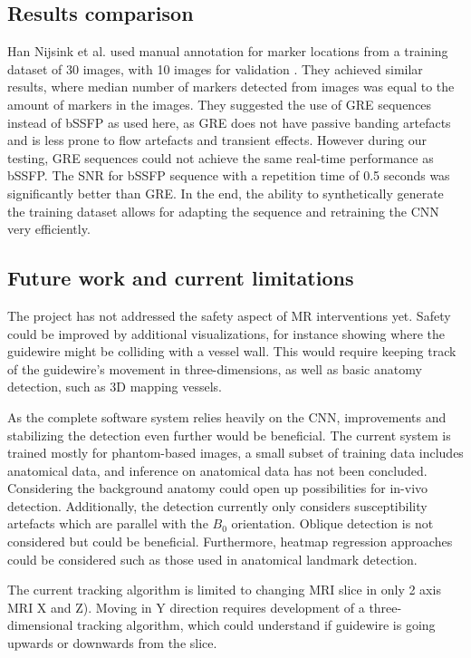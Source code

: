\documentclass[conference]{IEEEtran}
\begin{document}
\subsection{Results comparison}
Han Nijsink et al. used manual annotation for marker locations from a training dataset of 30 images, with 10 images for validation \cite{pmid35199259}. They achieved similar results, where median number of markers detected from images was equal to the amount of markers in the images. They suggested the use of GRE sequences instead of bSSFP as used here, as GRE does not have passive banding artefacts and is less prone to flow artefacts and transient effects. However during our testing, GRE sequences could not achieve the same real-time performance as bSSFP. The SNR for bSSFP sequence with a repetition time of 0.5 seconds was significantly better than GRE. In the end, the ability to synthetically generate the training dataset allows for adapting the sequence and retraining the CNN very efficiently.

\subsection{Future work and current limitations}

The project has not addressed the safety aspect of MR interventions yet. Safety could be improved by additional visualizations, for instance showing where the guidewire might be colliding with a vessel wall. This would require keeping track of the guidewire's movement in three-dimensions, as well as basic anatomy detection, such as 3D mapping vessels.

As the complete software system relies heavily on the CNN, improvements and stabilizing the detection even further would be beneficial. The current system is trained mostly for phantom-based images, a small subset of training data includes anatomical data, and inference on anatomical data has not been concluded. Considering the background anatomy could open up possibilities for in-vivo detection. Additionally, the detection currently only considers susceptibility artefacts which are parallel with the $B_0$ orientation. Oblique detection is not considered but could be beneficial. Furthermore, heatmap regression approaches could be considered such as those used in anatomical landmark detection.

The current tracking algorithm is limited to changing MRI slice in only 2 axis MRI X and Z). Moving in Y direction requires development of a three-dimensional tracking algorithm, which could understand if guidewire is going upwards or downwards from the slice. 
\end{document}
